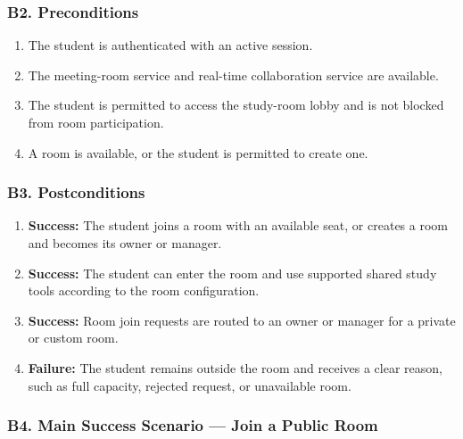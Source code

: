 \documentclass[12pt]{article}
\begin{document}
\subsubsection*{B2. Preconditions}
\par\medskip

\begin{enumerate}
\item The student is authenticated with an active session.
\item The meeting-room service and real-time collaboration service are available.
\item The student is permitted to access the study-room lobby and is not blocked from room participation.
\item A room is available, or the student is permitted to create one.
\end{enumerate}
\par\medskip

\hypertarget{sec:b3-postconditions}{}
\subsubsection*{B3. Postconditions}
\par\medskip

\begin{enumerate}
\item \textbf{Success:} The student joins a room with an available seat, or creates a room and becomes its owner or manager.
\item \textbf{Success:} The student can enter the room and use supported shared study tools according to the room configuration.
\item \textbf{Success:} Room join requests are routed to an owner or manager for a private or custom room.
\item \textbf{Failure:} The student remains outside the room and receives a clear reason, such as full capacity, rejected request, or unavailable room.
\end{enumerate}
\par\medskip

\hypertarget{sec:b4-main-success-scenario-join-a-public-room}{}
\subsubsection*{B4. Main Success Scenario --- Join a Public Room}
\par\medskip
\end{document}
